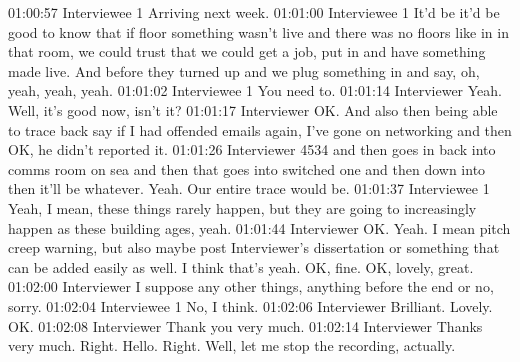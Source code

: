 01:00:57 Interviewee 1
Arriving next week.
01:01:00 Interviewee 1
It'd be it'd be good to know that if floor something wasn't live and there was no floors like in in that room, we could trust that we could get a job, put in and have something made live. And before they turned up and we plug something in and say, oh, yeah, yeah, yeah.
01:01:02 Interviewee 1
You need to.
01:01:14 Interviewer
Yeah. Well, it's good now, isn't it?
01:01:17 Interviewer
OK. And also then being able to trace back say if I had offended emails again, I've gone on networking and then OK, he didn't reported it.
01:01:26 Interviewer
4534 and then goes in back into comms room on sea and then that goes into switched one and then down into then it'll be whatever. Yeah. Our entire trace would be.
01:01:37 Interviewee 1
Yeah, I mean, these things rarely happen, but they are going to increasingly happen as these building ages, yeah.
01:01:44 Interviewer
OK. Yeah. I mean pitch creep warning, but also maybe post Interviewer's dissertation or something that can be added easily as well. I think that's yeah. OK, fine. OK, lovely, great.
01:02:00 Interviewer
I suppose any other things, anything before the end or no, sorry.
01:02:04 Interviewee 1
No, I think.
01:02:06 Interviewer
Brilliant. Lovely. OK.
01:02:08 Interviewer
Thank you very much.
01:02:14 Interviewer
Thanks very much. Right. Hello. Right. Well, let me stop the recording, actually.

